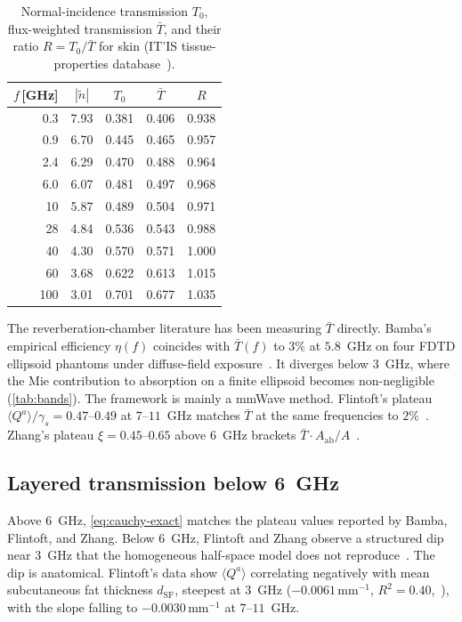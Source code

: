 \documentclass[journal,twocolumn,10pt]{IEEEtran}
\newcommand{\Aab}{A_{\mathrm{ab}}}
\newcommand{\Tbar}{\bar{T}}
\newcommand{\ntilde}{\tilde{n}}
\begin{document}
\begin{table}[!t]
\centering
\caption{Normal-incidence transmission $T_0$, flux-weighted
transmission $\Tbar$, and their ratio $R = T_0/\Tbar$ for skin
(IT'IS tissue-properties database~\cite{ITISv5,Gabriel1996}).}\label{tab:Tbar}
\begin{tabular}{rcccc}
\toprule
$f$\,[GHz] & $|\ntilde|$ & $T_0$ & $\Tbar$ & $R$ \\
\midrule
0.3 & 7.93 & 0.381 & 0.406 & 0.938 \\
0.9 & 6.70 & 0.445 & 0.465 & 0.957 \\
2.4 & 6.29 & 0.470 & 0.488 & 0.964 \\
6.0 & 6.07 & 0.481 & 0.497 & 0.968 \\
10  & 5.87 & 0.489 & 0.504 & 0.971 \\
28  & 4.84 & 0.536 & 0.543 & 0.988 \\
40  & 4.30 & 0.570 & 0.571 & 1.000 \\
60  & 3.68 & 0.622 & 0.613 & 1.015 \\
100 & 3.01 & 0.701 & 0.677 & 1.035 \\
\bottomrule
\end{tabular}
\end{table}

The reverberation-chamber literature has been measuring $\Tbar$
directly. Bamba's empirical efficiency $\eta(f)$
coincides with $\Tbar(f)$ to $3\%$ at $5.8$~GHz on four FDTD ellipsoid
phantoms under diffuse-field exposure~\cite{Bamba2014}. It diverges below
$3$~GHz, where the Mie contribution to absorption on a finite
ellipsoid becomes non-negligible (\cref{tab:bands}). The framework
is mainly a mmWave method.
Flintoft's plateau $\langle Q^a\rangle/\gamma_s = 0.47$--$0.49$
at $7$--$11$~GHz matches $\Tbar$ at the same frequencies to $2\%$~\cite{Flintoft2014}.
Zhang's plateau $\xi = 0.45$--$0.65$ above $6$~GHz brackets
$\Tbar\cdot\Aab/A$~\cite{Zhang2017thesis}.

\subsection{Layered transmission below 6~GHz}\label{subsec:fp}

Above $6$~GHz, \eqref{eq:cauchy-exact} matches the plateau values
reported by Bamba, Flintoft, and Zhang. Below $6$~GHz, Flintoft and
Zhang observe a structured dip near $3$~GHz that the homogeneous
half-space model does not reproduce~\cite{Flintoft2014,Zhang2017thesis}. The
dip is anatomical. Flintoft's data show $\langle Q^a\rangle$
correlating negatively with mean subcutaneous fat
thickness $d_{\mathrm{SF}}$, steepest at $3$~GHz
($-0.0061\,\mathrm{mm}^{-1}$, $R^2 = 0.40$,~\cite[Table~6]{Flintoft2014}),
with the slope falling to $-0.0030\,\mathrm{mm}^{-1}$ at $7$--$11$~GHz.
\end{document}

